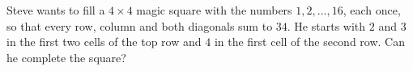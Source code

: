 Steve wants to fill a $4\times4$ magic square with the numbers $1,2,\dots,16$, each once, so that every row, column and both diagonals sum to $34$. He starts with $2$ and $3$ in the first two cells of the top row and $4$ in the first cell of the second row. Can he complete the square?
